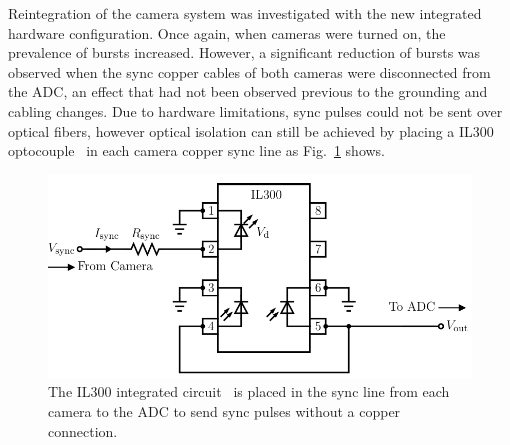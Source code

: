 Reintegration of the camera system was investigated with the new integrated hardware configuration. Once again, when cameras were turned on, the prevalence of bursts increased. However, a significant reduction of bursts was observed when the sync copper cables of both cameras were disconnected from the ADC, an effect that had not been observed previous to the grounding and cabling changes. Due to hardware limitations, sync pulses could not be sent over optical fibers, however optical isolation can still be achieved by placing a IL300 optocouple~\cite{il300} in each camera copper sync line as Fig.~\ref{fig:optocoupler} shows.   
\begin{figure}[htb]
    \centering
	\vspace*{-10pt}
    \includegraphics[width=5.5in]{figs/param/optocoupler_circuit_width_5_5in.pdf}
    \caption{The IL300 integrated circuit~\cite{il300} is placed in the sync line from each camera to the ADC to send sync pulses without a copper connection.}
    \label{fig:optocoupler}
	\vspace*{-5pt}
\end{figure}

